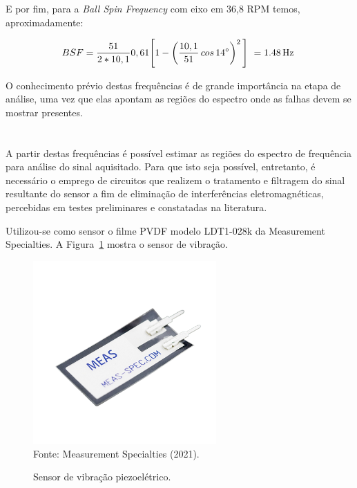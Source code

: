 \documentclass[
	12pt,				
	oneside,			
	a4paper,			
	english,			
	brazil,			
	]{abntex2ppgsi}
\begin{document}
E por fim, para a \textit{Ball Spin Frequency} com eixo em 36,8 RPM temos, aproximadamente:

\begin{equation}
	BSF = \frac{51}{2*10,1}0,61 \Bigg[  1 - \left ( \frac{10,1}{51} \,cos \, \ang{14} \right ) ^{2}  \Bigg] \ = \SI{1,48}{{\hertz}} \
	\label{eq: BSF no rolamento}
\end{equation}


O conhecimento prévio destas frequências é de grande importância na etapa de análise, uma vez que elas apontam as regiões do espectro onde as falhas devem se mostrar presentes.

\section{}
\label{secao:CircuitosCondicionnadores}

A partir destas frequências é possível estimar as regiões do espectro de frequência para análise do sinal aquisitado. Para que isto seja possível, entretanto, é necessário o emprego de circuitos que realizem o tratamento e filtragem do sinal resultante do sensor a fim de eliminação de interferências eletromagnéticas, percebidas em testes preliminares e constatadas na literatura.  

Utilizou-se como sensor o filme PVDF modelo LDT1-028k da Measurement Specialties. A Figura~\ref{Figura21} mostra o sensor de vibração. 

\begin{figure}[H]
\centering
\caption {Sensor de vibração piezoelétrico.}
\includegraphics[width=\textwidth,height=70mm,keepaspectratio]{Figura21} 
\label{Figura21} \\
Fonte: Measurement Specialties (2021).
\end{figure} 
\end{document}
